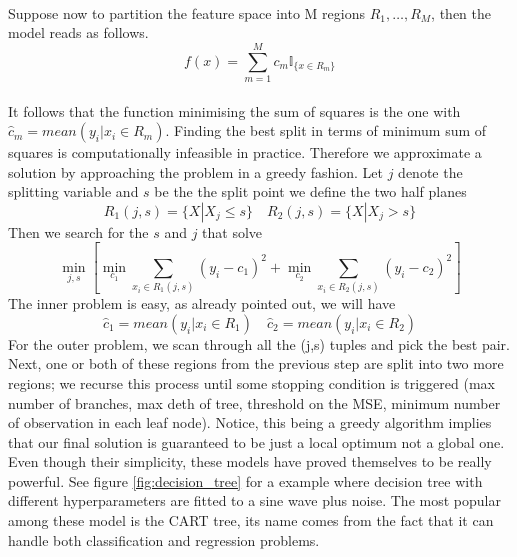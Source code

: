 \\
Suppose now to partition the feature space into M regions $R_1,\dots,R_M$, then the model reads as follows.
\begin{equation}
    f(x)=\sum\limits_{m=1}^{M}c_m\mathbb{I}_{\{x \in R_m\}}
\end{equation}
\\
It follows that the function minimising the sum of squares is the one with $\hat{c}_m=mean(y_i|x_i \in R_m)$.
Finding the best split in terms of minimum sum of squares is computationally infeasible in practice. Therefore we approximate a solution by approaching the problem in a greedy fashion.
Let $j$ denote the splitting variable and $s$ be the the split point we define the two half planes
\begin{equation}
    R_1(j,s)=\{X|X_j\leq s\} \quad R_2(j,s)=\{X|X_j >s\}
\end{equation}
Then we search for the $s$ and $j$ that solve
\begin{equation}
    \min_{j,s}\left[\min_{c_1} \sum\limits_{x_i \in R_1(j,s)}(y_i-c_1)^2+\min_{c_2} \sum\limits_{x_i \in R_2(j,s)}(y_i-c_2)^2\right]
\end{equation}
The inner problem is easy, as already pointed out, we will have 
\begin{equation}
    \hat{c}_1=mean(y_i|x_i \in R_1) \quad \hat{c}_2=mean(y_i|x_i \in R_2)
\end{equation}
For the outer problem, we scan through all the (j,s) tuples and pick the best pair. 
Next, one or both of these regions from the previous step are split into two more regions; we recurse this process until some stopping condition is triggered (max number of branches, max deth of tree, threshold on the MSE, minimum number of observation in each leaf node).
Notice, this being a greedy algorithm implies that our final solution is guaranteed to be just a local optimum not a global one.
Even though their simplicity, these models have proved themselves to be really powerful. See figure \ref{fig:decision_tree} for a example where decision tree with different hyperparameters are fitted to a sine wave plus noise. The most popular among these model is the CART \cite{breiman2017classification} tree, its name comes from the fact that it can handle both classification and regression problems.
